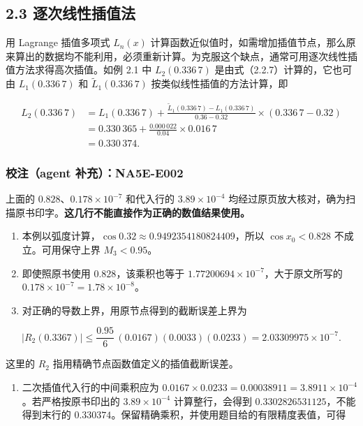 \documentclass[
  10pt,
  fontset=fandol]{ctexart}
\providecommand{\tightlist}{%
  \setlength{\itemsep}{0pt}\setlength{\parskip}{0pt}}
\begin{document}
\subsection{2.3 逐次线性插值法}\label{ux9010ux6b21ux7ebfux6027ux63d2ux503cux6cd5}

用 Lagrange 插值多项式 \(L_n(x)\) 计算函数近似值时，如需增加插值节点，那么原来算出的数据均不能利用，必须重新计算。为克服这个缺点，通常可用逐次线性插值方法求得高次插值。如例 2.1 中 \(L_2(0.336\,7)\) 是由式（2.2.7）计算的，它也可由 \(L_1(0.336\,7)\) 和 \(\widetilde L_1(0.336\,7)\) 按类似线性插值的方法计算，即

\[
\begin{aligned}
L_2(0.336\,7)
&=L_1(0.336\,7)
+\frac{\widetilde L_1(0.336\,7)-L_1(0.336\,7)}{0.36-0.32}
\times(0.336\,7-0.32)\\
&=0.330\,365+\frac{0.000\,022}{0.04}\times0.016\,7\\
&=0.330\,374.
\end{aligned}
\]

\subsubsection{校注（agent 补充）：NA5E-E002}\label{ux6821ux6ce8agent-ux8865ux5145na5e-e002}

上面的 \(0.828\)、\(0.178\times10^{-7}\) 和代入行的 \(3.89\times10^{-4}\) 均经过原页放大核对，确为扫描原书印字。\textbf{这几行不能直接作为正确的数值结果使用。}

\begin{enumerate}
\def\labelenumi{\arabic{enumi}.}
\tightlist
\item
  本例以弧度计算，\(\cos0.32\approx0.9492354180824409\)，所以 \(\cos x_0<0.828\) 不成立。可用保守上界 \(M_3<0.95\)。
\item
  即使照原书使用 \(0.828\)，该乘积也等于 \(1.77200694\times10^{-7}\)，大于原文所写的 \(0.178\times10^{-7}=1.78\times10^{-8}\)。
\item
  对正确的导数上界，用原节点得到的截断误差上界为
\end{enumerate}

\[
|R_2(0.3367)|
\le\frac{0.95}{6}\,(0.0167)(0.0033)(0.0233)
=2.03309975\times10^{-7}.
\]

这里的 \(R_2\) 指用精确节点函数值定义的插值截断误差。

\begin{enumerate}
\def\labelenumi{\arabic{enumi}.}
\setcounter{enumi}{3}
\tightlist
\item
  二次插值代入行的中间乘积应为 \(0.0167\times0.0233=0.00038911=3.8911\times10^{-4}\)。若严格按原书印出的 \(3.89\times10^{-4}\) 计算整行，会得到 \(0.3302826531125\)，不能得到末行的 \(0.330374\)。保留精确乘积，并使用题目给的有限精度表值，可得
\end{enumerate}
\end{document}

